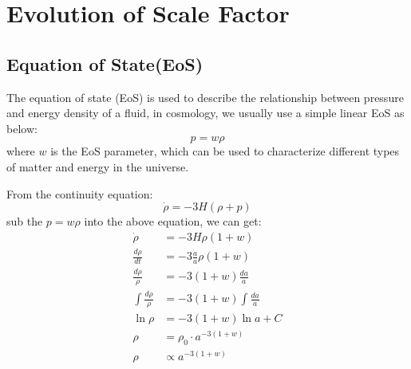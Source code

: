\section{Evolution of Scale Factor}
\subsection{Equation of State(EoS)}
\begin{intuition}
    The equation of state (EoS) is used to describe the relationship between pressure and energy density of a fluid, in cosmology, we usually use a simple linear EoS as below:
    \[
        p = w \rho
    \]
    where $w$ is the EoS parameter, which can be used to characterize different types of matter and energy in the universe. \\
\end{intuition}

\bigskip \noindent
\begin{foundation}
    From the continuity equation:
    \[
        \dot{\rho} = - 3H(\rho + p) 
    \]
    sub the $p = w \rho$ into the above equation, we can get:
    \begin{align*}
        \dot{\rho} &= - 3H \rho (1 + w) \\
        \frac{d\rho}{dt} &= - 3 \frac{\dot{a}}{a} \rho (1 + w) \\
        \frac{d\rho}{\rho} &= - 3 (1 + w) \frac{da}{a} \\
        \int \frac{d\rho}{\rho} &= - 3 (1 + w) \int \frac{da}{a} \\
        \ln \rho &= - 3 (1 + w) \ln a + C \\
        \rho &= \rho_0 \cdot a^{-3(1+w)} \\
        \rho &\propto a^{-3(1+w)}
    \end{align*}
\end{foundation}

